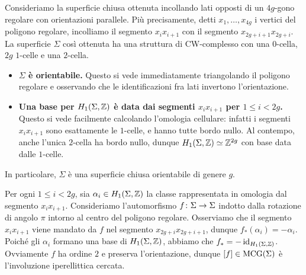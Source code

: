 Consideriamo la superficie chiusa ottenuta incollando lati opposti di un $4g$-gono regolare con orientazioni parallele. Più precisamente, detti $x_1,\ldots,x_{4g}$ i vertici del poligono regolare, incolliamo il segmento $x_ix_{i+1}$ con il segmento $x_{2g+i+1}x_{2g+i}$. La superficie $\Sigma$ così ottenuta ha una struttura di CW-complesso con una $0$-cella, $2g$ $1$-celle e una $2$-cella.
\begin{center}
\end{center}
\begin{itemize}
\item\textbf{$\Sigma$ è orientabile.} Questo si vede immediatamente triangolando il poligono regolare e osservando che le identificazioni fra lati invertono l'orientazione.
\item\textbf{Una base per $H_1(\Sigma,\mathbb{Z})$ è data dai segmenti $x_ix_{i+1}$ per $1\le i<2g$.} Questo si vede facilmente calcolando l'omologia cellulare: infatti i segmenti $x_ix_{i+1}$ sono esattamente le $1$-celle, e hanno tutte bordo nullo. Al contempo, anche l'unica $2$-cella ha bordo nullo, dunque $H_1(\Sigma,\mathbb{Z})\simeq\mathbb{Z}^{2g}$ con base data dalle $1$-celle.
\end{itemize}
In particolare, $\Sigma$ è una superficie chiusa orientabile di genere $g$.

Per ogni $1\le i<2g$, sia $\alpha_i\in H_1(\Sigma,\mathbb{Z})$ la classe rappresentata in omologia dal segmento $x_ix_{i+1}$. Consideriamo l'automorfismo $\map{f}{\Sigma}{\Sigma}$ indotto dalla rotazione di angolo $\pi$ intorno al centro del poligono regolare. Osserviamo che il segmento $x_ix_{i+1}$ viene mandato da $f$ nel segmento $x_{2g+i}x_{2g+i+1}$, dunque $f_*(\alpha_i)=-\alpha_i$. Poiché gli $\alpha_i$ formano una base di $H_1(\Sigma,\mathbb{Z})$, abbiamo che $f_*=-\operatorname{id}_{H_1(\Sigma,\mathbb{Z})}$. Ovviamente $f$ ha ordine $2$ e preserva l'orientazione, dunque $[f]\in\operatorname{MCG}(\Sigma)$ è l'involuzione iperellittica cercata.


